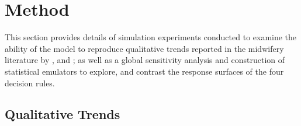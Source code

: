 \section{Method}
\label{sec:method}

This section provides details of simulation experiments conducted to examine the ability of the model to reproduce qualitative trends reported in the midwifery literature by \citet{Alvik2006}, and \citet{Phillips2007}; as well as a global sensitivity analysis and construction of statistical emulators to explore, and contrast the response surfaces of the four decision rules.

\subsection{Qualitative Trends}
\label{sub:qt}


